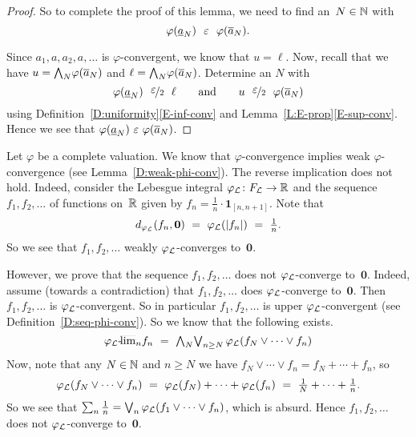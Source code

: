 \documentclass[main.tex]{subfiles}
\begin{document}
\begin{proof}
So to complete the proof of this lemma,
we need to find an~$N\in\mathbb{N}$ with
\begin{equation*}
\varphi(\ul{a}_N) \ \ \ve\ \ \varphi(\ol{a}_N).
\end{equation*}

Since $a_1,a,a_2,a,\dotsc$
is $\varphi$-convergent,
we know that $u = \ell$.
Now, recall that we have $u = \textstyle{\bigwedge}_N \varphi(\overline{a}_N)$
and $\ell = \textstyle{\bigwedge}_N \varphi(\overline{a}_N)$.
Determine
an $N$ with
\begin{equation*}
\varphi(\underline{a}_N) \ \ \smash{\nicefrac{\textstyle{\varepsilon}}{2}}\ \ \ell
\qquad\text{and}\qquad
u \ \ \smash{\nicefrac{\textstyle{\varepsilon}}{2}} \ \ \varphi(\overline{a}_N)
\end{equation*}
using Definition~\ref{D:uniformity}\ref{E-inf-conv}
and Lemma~\ref{L:E-prop}\ref{E-sup-conv}.
Hence we see that $\varphi(\underline{a}_N) \ \ve \ \varphi(\ol{a}_N)$.
\end{proof}
%
%
\begin{ex}
\label{E:weak-phi-conv}
Let $\varphi$ be a complete valuation.
We know that $\varphi$-convergence
implies weak $\varphi$-convergence (see Lemma~\ref{D:weak-phi-conv}).
The reverse implication does not hold.
Indeed,
consider the Lebesgue integral $\varphi_{\mathcal{L}}\colon F_{\mathcal{L}} \rightarrow \mathbb{R}$
and the sequence
$f_1,f_2, \dotsc$ of functions on~$\mathbb{R}$
given by $f_n = \frac{1}{n}\cdot\mathbf{1}_{[n,n+1]}$.
Note that 
\begin{equation*}
\textstyle{d_{\smash{\varphi_{\mathcal{L}}}}(f_n, \mathbf{0}) \ =\  \varphi_{\mathcal{L}}(|f_n|) 
\ =\ \frac{1}{n}.}
\end{equation*}
So we see that $f_1,f_2,\dotsc$ weakly $\varphi_{\mathcal{L}}$-converges to~$\mathbf{0}$.

However, we prove that the sequence $f_1,f_2,\dotsc$ 
does not $\varphi_{\mathcal{L}}$-converge to~$\mathbf{0}$.
Indeed, assume
(towards a contradiction) that
 $f_1,f_2,\dotsc$ does $\varphi_{\mathcal{L}}$-converge to~$\mathbf{0}$.
Then $f_1,f_2,\dotsc$ is $\varphi_{\mathcal{L}}$-convergent.
So in particular $f_1,f_2,\dotsc$ is upper $\varphi_{\mathcal{L}}$-convergent
(see Definition~\ref{D:seq-phi-conv}).
So we know that the following exists.
\begin{equation*}
{\varphi_{\mathcal{L}}}\text{-}\!\smash{\overline{\lim}_{n}} f_n 
\ = \ \textstyle{\bigwedge}_N \textstyle{\bigvee}_{n\geq N} \,\varphi_{\mathcal{L}}(f_N\vee \dotsb \vee f_n)
\end{equation*}
Now, note that any $N\in\mathbb{N}$ and $n\geq N$ we have
$f_N\vee \dotsb \vee f_n = f_N + \dotsb + f_n$,
so 
\begin{equation*}
\textstyle{\Lphi(f_N\vee \dotsb\vee f_n) 
\ =\ \Lphi(f_N) + \dotsb + \Lphi(f_n) \ = \ 
 \frac{1}{N} + \dotsb + \frac{1}{n}}.
\end{equation*}
%
%
%
So we see that  $\sum_{n} \frac{1}{n} 
= \bigvee_{n} \varphi_{\mathcal{L}}(f_1\vee\dotsb \vee f_n)$,
 which is absurd.
Hence $f_1,f_2,\dotsc$ 
does not $\varphi_{\mathcal{L}}$-converge to~$\mathbf{0}$.
\end{ex}
\end{document}
